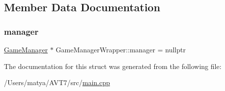 \subsection{Member Data Documentation}
\mbox{\label{struct_game_manager_wrapper_a67a006a4732fbc577974dc9c7ce118d5}} 
\subsubsection{\texorpdfstring{manager}{manager}}
{\footnotesize\ttfamily \hyperlink{class_game_manager}{Game\+Manager} $\ast$ Game\+Manager\+Wrapper\+::manager = nullptr\hspace{0.3cm}{\ttfamily [static]}}



The documentation for this struct was generated from the following file\+:\begin{DoxyCompactItemize}
\item 
/\+Users/matya/\+A\+V\+T7/src/\hyperlink{main_8cpp}{main.\+cpp}\end{DoxyCompactItemize}
